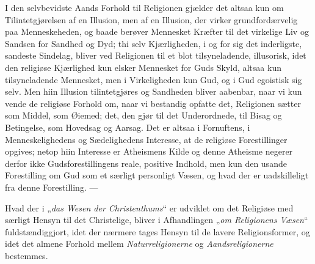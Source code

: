 I den selvbevidste Aands Forhold til Religionen gjælder det altsaa kun om
Tilintetgjørelsen af en Illusion, men af en Illusion, der virker
grundfordærvelig paa Menneskeheden, og baade berøver Mennesket Kræfter til det
virkelige Liv og Sandsen for Sandhed og Dyd; thi selv Kjærligheden, i og for
sig det inderligste, sandeste Sindelag, bliver ved Religionen til et blot
tilsyneladende, illusorisk, idet den religiøse Kjærlighed kun elsker Mennesket
for Guds Skyld, altsaa kun tilsyneladende Mennesket, men i Virkeligheden kun
Gud, og i Gud egoistisk sig selv. Men hiin Illusion tilintetgjøres og Sandheden
bliver aabenbar, naar vi kun vende de religiøse Forhold om, naar vi bestandig
opfatte det, Religionen sætter som Middel, som Øiemed; det, den gjør til det
Underordnede, til Bisag og Betingelse, som Hovedsag og Aarsag.
Det er altsaa i Fornuftens, i Menneskelighedens og Sædelighedens Interesse, at
de religiøse Forestillinger opgives; netop hiin Interesse er Atheismens Kilde og
denne Atheisme negerer derfor ikke Gudsforestillingens reale, positive Indhold,
men kun den usande Forestilling om Gud som et særligt personligt Væsen, og hvad
der er uadskilleligt fra denne Forestilling. ---

Hvad der i „\emph{das Wesen der Christenthums}“ er
 udviklet om det Religiøse med særligt Hensyn til det Christelige, bliver i
Afhandlingen „\emph{om Religionens Væsen}“ fuldstændiggjort, idet der nærmere
tages Hensyn til de lavere Religionsformer, og idet det almene Forhold mellem
\emph{Naturreligionerne} og \emph{Aandsreligionerne} bestemmes.

